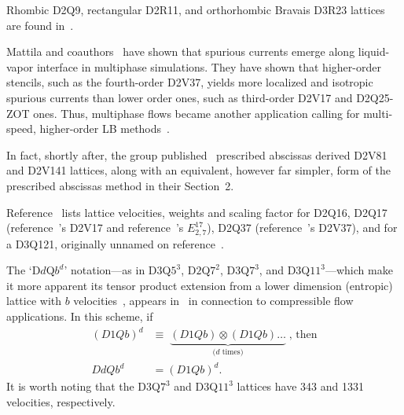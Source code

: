     Rhombic     D2Q9,     rectangular     D2R11,     and     orthorhombic     Bravais     D3R23     lattices      are      found
    in~\cite{2013-HegeleJr+PhilippiPC-JSciComput}.

    Mattila  and  coauthors~\cite{2013-MattilaKK+PhilippiPC-IntJModPhysC}  have  shown  that  spurious  currents  emerge   along
    liquid-vapor interface in multiphase simulations. They have shown that  higher-order  stencils,  such  as  the  fourth-order
    D2V37, yields more localized and isotropic spurious currents than lower order ones, such as third-order D2V17 and  D2Q25-ZOT
    ones.   Thus,   multiphase   flows   became   another    application    calling    for    multi-speed,    higher-order    LB
    methods~\cite{2014-SiebertDN+MattilaKK-PhysRevE}.

    In fact, shortly after, the group published~\cite{2014-MattilaKK+PhilippiPC-SciWorldJ} prescribed  abscissas  derived  D2V81
    and D2V141 lattices, along with an equivalent, however far simpler,  form  of  the  prescribed  abscissas  method  in  their
    Section~2.

    Reference~\cite{2014-MengJ+ZhangY-JComputPhys} lists lattice  velocities,  weights  and  scaling  factor  for  D2Q16,  D2Q17
    (reference~\cite{2007-SiebertDN+PhilippiPC-IntJModPhysC}'s D2V17 and reference~\cite{2010-ShanX-PhysRevE}'s $E_{2,7}^{17}$),
    D2Q37   (reference~\cite{2006-PhilippiPC+SurmasR-PhysRevE}'s   D2V37),   and   for   a   D3Q121,   originally   unnamed   on
    reference~\cite{2008-NieX+ChenH-PhysRevE}.

    The `D$d$Q$b^d$' notation---as in D$3$Q$5^3$, D$2$Q$7^2$, D$3$Q$7^3$, and D$3$Q$11^3$---which  make  it  more  apparent  its
    tensor     product      extension      from      a      lower      dimension      (entropic)      lattice      with      $b$
    velocities~\cite{2006-ChikatamarlaSS+KarlinIV-PhysRevLett},        appears        in~\cite{2015-FrapolliN+KarlinIV-PhysRevE,
    2016-FrapolliN+KarlinIV-PhysRevE} in connection to compressible flow applications. In this scheme, if
    \begin{align}
        (D1Qb)^d & \equiv \;\underbrace{(D1Qb) \otimes (D1Qb) \ldots}_{\mbox{($d$ times)}}\;\mbox{, then} \\
        DdQb^d   & = (D1Qb)^d.
    \end{align}
    It is worth noting that the D$3$Q$7^3$ and D$3$Q$11^3$ lattices have 343 and 1331 velocities, respectively.

